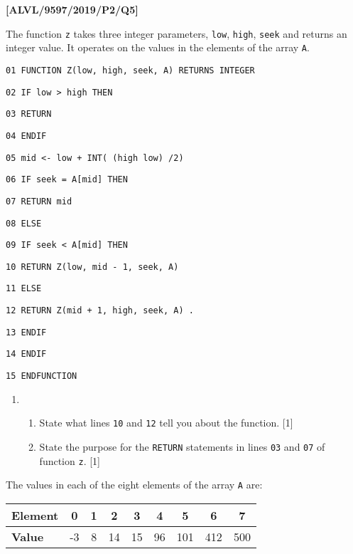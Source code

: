 \item \textbf{{[}ALVL/9597/2019/P2/Q5{]} }

The function \texttt{z} takes three integer parameters, \texttt{low},
\texttt{high}, \texttt{seek} and returns an integer value. It operates
on the values in the elements of the array \texttt{A}. 

\noindent %
\noindent\begin{minipage}[t]{1\columnwidth}%
\texttt{01 FUNCTION Z(low, high, seek, A) RETURNS INTEGER }

\texttt{02 \qquad{}IF low > high THEN }

\texttt{03 \qquad{}\qquad{}RETURN  }

\texttt{04 \qquad{}ENDIF }

\texttt{05 \qquad{}mid <- low + INT( (high \textemdash{} low) /2)}

\texttt{06 \qquad{}IF seek = A{[}mid{]} THEN}

\texttt{07 \qquad{}\qquad{}RETURN mid }

\texttt{08 \qquad{}ELSE }

\texttt{09 \qquad{}\qquad{}IF seek < A{[}mid{]} THEN }

\texttt{10 \qquad{}\qquad{}\qquad{}RETURN Z(low, mid - 1, seek,
A) }

\texttt{11 \qquad{}\qquad{}ELSE }

\texttt{12 \qquad{}\qquad{}\qquad{}RETURN Z(mid + 1, high, seek,
A) . }

\texttt{13 \qquad{}\qquad{}ENDIF }

\texttt{14 \qquad{}ENDIF }

\texttt{15 ENDFUNCTION}%
\end{minipage}
\begin{enumerate}
\item {}
\begin{enumerate}
\item State what lines \texttt{10} and \texttt{12} tell you about the function.
\hfill{}{[}1{]}
\item State the purpose for the \texttt{RETURN} statements in lines \texttt{03}
and \texttt{07} of function \texttt{z}. \hfill{} {[}1{]}
\end{enumerate}
\end{enumerate}
The values in each of the eight elements of the array \texttt{A} are:
\begin{center}
\begin{tabular}{|l|c|c|c|c|c|c|c|c|}
\multicolumn{1}{l}{\textbf{Element}} & \multicolumn{1}{c}{0} & \multicolumn{1}{c}{1} & \multicolumn{1}{c}{2} & \multicolumn{1}{c}{3} & \multicolumn{1}{c}{4} & \multicolumn{1}{c}{5} & \multicolumn{1}{c}{6} & \multicolumn{1}{c}{7}\tabularnewline
\hline 
\textbf{Value} & -3 & 8 & 14 & 15 & 96 & 101 & 412 & 500\tabularnewline
\hline 
\end{tabular}
\par\end{center}
